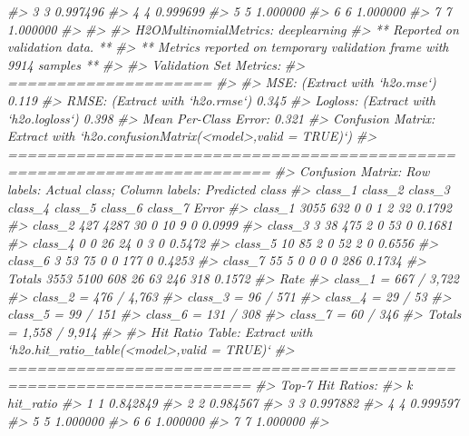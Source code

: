 \documentclass[]{book}
\newenvironment{Shaded}{\begin{snugshade}}{\end{snugshade}}
\newcommand{\CommentTok}[1]{\textcolor[rgb]{0.56,0.35,0.01}{\textit{#1}}}
\begin{document}
\begin{Shaded}
\begin{Highlighting}[]
{{{{{{\CommentTok{#> 3 3  0.997496}
\CommentTok{#> 4 4  0.999699}
\CommentTok{#> 5 5  1.000000}
\CommentTok{#> 6 6  1.000000}
\CommentTok{#> 7 7  1.000000}
\CommentTok{#> }
\CommentTok{#> }
\CommentTok{#> H2OMultinomialMetrics: deeplearning}
\CommentTok{#> ** Reported on validation data. **}
\CommentTok{#> ** Metrics reported on temporary validation frame with 9914 samples **}
\CommentTok{#> }
\CommentTok{#> Validation Set Metrics: }
\CommentTok{#> =====================}
\CommentTok{#> }
\CommentTok{#> MSE: (Extract with `h2o.mse`) 0.119}
\CommentTok{#> RMSE: (Extract with `h2o.rmse`) 0.345}
\CommentTok{#> Logloss: (Extract with `h2o.logloss`) 0.398}
\CommentTok{#> Mean Per-Class Error: 0.321}
\CommentTok{#> Confusion Matrix: Extract with `h2o.confusionMatrix(<model>,valid = TRUE)`)}
\CommentTok{#> =========================================================================}
\CommentTok{#> Confusion Matrix: Row labels: Actual class; Column labels: Predicted class}
\CommentTok{#>         class_1 class_2 class_3 class_4 class_5 class_6 class_7  Error}
\CommentTok{#> class_1    3055     632       0       0       1       2      32 0.1792}
\CommentTok{#> class_2     427    4287      30       0      10       9       0 0.0999}
\CommentTok{#> class_3       3      38     475       2       0      53       0 0.1681}
\CommentTok{#> class_4       0       0      26      24       0       3       0 0.5472}
\CommentTok{#> class_5      10      85       2       0      52       2       0 0.6556}
\CommentTok{#> class_6       3      53      75       0       0     177       0 0.4253}
\CommentTok{#> class_7      55       5       0       0       0       0     286 0.1734}
\CommentTok{#> Totals     3553    5100     608      26      63     246     318 0.1572}
\CommentTok{#>                    Rate}
\CommentTok{#> class_1 =   667 / 3,722}
\CommentTok{#> class_2 =   476 / 4,763}
\CommentTok{#> class_3 =      96 / 571}
\CommentTok{#> class_4 =       29 / 53}
\CommentTok{#> class_5 =      99 / 151}
\CommentTok{#> class_6 =     131 / 308}
\CommentTok{#> class_7 =      60 / 346}
\CommentTok{#> Totals  = 1,558 / 9,914}
\CommentTok{#> }
\CommentTok{#> Hit Ratio Table: Extract with `h2o.hit_ratio_table(<model>,valid = TRUE)`}
\CommentTok{#> =======================================================================}
\CommentTok{#> Top-7 Hit Ratios: }
\CommentTok{#>   k hit_ratio}
\CommentTok{#> 1 1  0.842849}
\CommentTok{#> 2 2  0.984567}
\CommentTok{#> 3 3  0.997882}
\CommentTok{#> 4 4  0.999597}
\CommentTok{#> 5 5  1.000000}
\CommentTok{#> 6 6  1.000000}
\CommentTok{#> 7 7  1.000000}
\CommentTok{#> }
}}}}}}
\end{Highlighting}
\end{Shaded}
\end{document}
